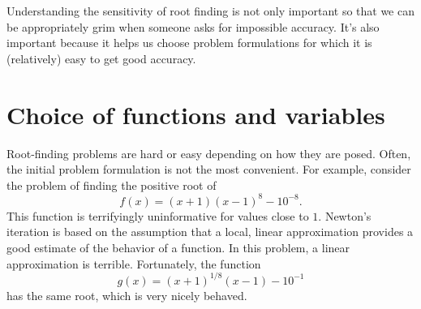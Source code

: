 \documentclass[12pt, leqno]{article}
\begin{document}
Understanding the sensitivity of root finding is not only important so
that we can be appropriately grim when someone asks for impossible
accuracy.  It's also important because it helps us choose problem
formulations for which it is (relatively) easy to get good accuracy.

\section*{Choice of functions and variables}




Root-finding problems are hard or easy depending on how they are
posed.  Often, the initial problem formulation is not the most
convenient.  For example, consider the problem of finding the
positive root of
\[
  f(x) = (x+1)(x-1)^8-10^{-8}.
\]
This function is terrifyingly uninformative for values close to $1$.
Newton's iteration is based on the assumption that a local, linear
approximation provides a good estimate of the behavior of a function.
In this problem, a linear approximation is terrible.  Fortunately,
the function
\[
  g(x) = (x+1)^{1/8} (x-1)-10^{-1}
\]
has the same root, which is very nicely behaved.
\end{document}
